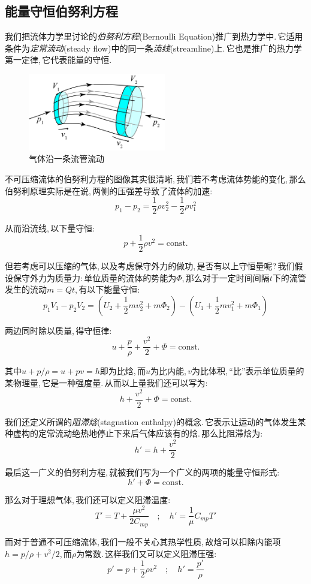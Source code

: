 \subsection{能量守恒\ca 伯努利方程}
我们把流体力学里讨论的\emph{伯努利方程}(Bernoulli Equation)推广到热力学中.\,它适用条件为\emph{定常流动}(steady flow)中的同一条\emph{流线}(streamline)上.\,它也是推广的热力学第一定律,\,它代表能量的守恒.

\begin{figure}
\includegraphics[width=6cm]{image/5-1-11.png}
\caption{气体沿一条流管流动}
\end{figure}
不可压缩流体的伯努利方程的图像其实很清晰,\,我们若不考虑流体势能的变化,\,那么伯努利原理实际是在说,\,两侧的压强差导致了流体的加速:
\[p_1-p_2=\frac{1}{2}\rho v_2^2-\frac{1}{2}\rho v_1^2\]

从而沿流线,\,以下量守恒:
\[p+\frac{1}{2}\rho v^2=\mathrm{const.}\]

但若考虑可以压缩的气体,\,以及考虑保守外力的做功,\,是否有以上守恒量呢?\,我们假设保守外力为质量力:\,单位质量的流体的势能为$\Phi$,\,那么对于一定时间间隔$t$下的流管发生的流动$m=Qt$,\,有以下能量守恒:
\[p_1V_1-p_2V_2=(U_2+\frac{1}{2}mv_2^2+m\Phi_2)-(U_1+\frac{1}{2}mv_1^2+m\Phi_1)\]

两边同时除以质量,\,得守恒律:
\[u+\frac{p}{\rho}+\frac{v^2}{2}+\Phi=\mathrm{const.}\]

其中$u+p/\rho=u+pv=h$即为比焓,\,而$u$为比内能,\,$v$为比体积,\,``比''表示单位质量的某物理量,\,它是一种强度量.\,从而以上量我们还可以写为:
\[h+\frac{v^2}{2}+\Phi=\mathrm{const.}\]

我们还定义所谓的\emph{阻滞焓}(stagnation enthalpy)的概念.\,它表示让运动的气体发生某种虚构的定常流动绝热地停止下来后气体应该有的焓.\,那么比阻滞焓为:
\[h'=h+\frac{v^2}{2}\]

最后这一广义的伯努利方程,\,就被我们写为一个广义的两项的能量守恒形式:
\[h'+\Phi=\mathrm{const.}\]

那么对于理想气体,\,我们还可以定义阻滞温度:
\[T'=T+\frac{\mu v^2}{2C_{mp}} \quad ; \quad h'=\frac{1}{\mu}C_{mp}T'\]

而对于普通不可压缩流体,\,我们一般不关心其热学性质,\,故焓可以扣除内能项$h=p/\rho +v^2/2$,\,而$\rho$为常数.\,这样我们又可以定义阻滞压强:
\[p'=p+\frac{1}{2}\rho v^2\quad;\quad h'=\frac{p'}{\rho}\]




